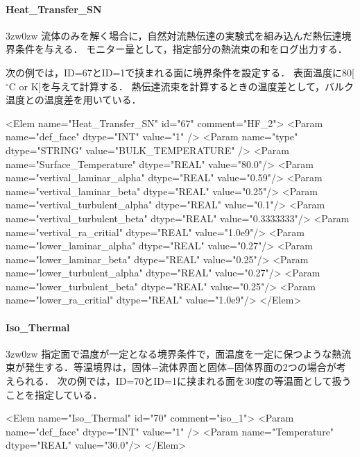 %
\paragraph{Heat\_Transfer\_SN}
\begin{indentation}{3zw}{0zw}
流体のみを解く場合に，自然対流熱伝達の実験式を組み込んだ熱伝達境界条件を与える．
モニター量として，指定部分の熱流束の和をログ出力する．

次の例では，ID=67とID=1で挟まれる面に境界条件を設定する．
表面温度に80[${}^\circ \mathrm{C}$ or K]を与えて計算する．
熱伝達流束を計算するときの温度差として，バルク温度との温度差を用いている．
{ \small
\begin{program}
<Elem name="Heat_Transfer_SN" id="67"  comment="HF_2">
  <Param name="def_face"    dtype="INT"    value="1" />
  <Param name="type"    dtype="STRING"    value="BULK_TEMPERATURE" />
  <Param name="Surface_Temperature" dtype="REAL" value="80.0"/>
  <Param name="vertival_laminar_alpha" dtype="REAL" value="0.59"/>
  <Param name="vertival_laminar_beta"  dtype="REAL" value="0.25"/>
  <Param name="vertival_turbulent_alpha" dtype="REAL" value="0.1"/>
  <Param name="vertival_turbulent_beta"  dtype="REAL" value="0.3333333"/>
  <Param name="vertival_ra_critial" dtype="REAL" value="1.0e9"/>
  <Param name="lower_laminar_alpha" dtype="REAL" value="0.27"/>
  <Param name="lower_laminar_beta"  dtype="REAL" value="0.25"/>
  <Param name="lower_turbulent_alpha" dtype="REAL" value="0.27"/>
  <Param name="lower_turbulent_beta"  dtype="REAL" value="0.25"/>
  <Param name="lower_ra_critial" dtype="REAL" value="1.0e9"/>
</Elem>
\end{program}
}
\end{indentation}

%
\paragraph{Iso\_Thermal}
\begin{indentation}{3zw}{0zw}
指定面で温度が一定となる境界条件で，面温度を一定に保つような熱流束が発生する．等温境界は，固体−流体界面と固体−固体界面の2つの場合が考えられる．
次の例では，ID=70とID=1に挟まれる面を30度の等温面として扱うことを指定している．
{ \small
\begin{program}
<Elem name="Iso_Thermal" id="70"  comment="iso_1">
  <Param name="def_face"    dtype="INT"    value="1" />
  <Param name="Temperature" dtype="REAL" value="30.0"/>
</Elem>
\end{program}
}
\end{indentation}

